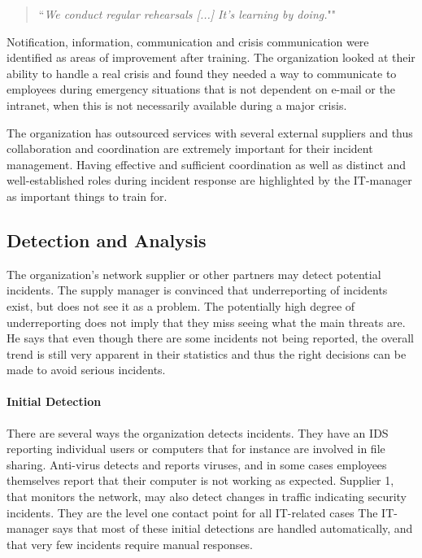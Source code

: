 \begin{quote}
``\textit{We conduct regular rehearsals [...] It's learning by doing.}""
\end{quote}

Notification, information, communication and crisis communication were identified as areas of improvement after training. The organization looked at their ability to handle a real crisis and found they needed a way to communicate to employees during emergency situations that is not dependent on e-mail or the intranet, when this is not necessarily available during a major crisis.

The organization has outsourced services with several external suppliers and thus collaboration and coordination are extremely important for their incident management. Having effective and sufficient coordination as well as distinct and well-established roles during incident response are highlighted by the IT-manager as important things to train for.

\subsection{Detection and Analysis}
The organization's network supplier or other partners may detect potential incidents. The supply manager is convinced that underreporting of incidents exist, but does not see it as a problem. The potentially high degree of underreporting does not imply that they miss seeing what the main threats are. He says that even though there are some incidents not being reported, the overall trend is still very apparent in their statistics and thus the right decisions can be made to avoid serious incidents. 

\paragraph{Initial Detection}
There are several ways the organization detects incidents. They have an \ac{IDS} reporting individual users or computers that for instance are involved in file sharing. Anti-virus detects and reports viruses, and in some cases employees themselves report that their computer is not working as expected. Supplier 1, that monitors the network, may also detect changes in traffic indicating security incidents. They are the level one contact point for all IT-related cases The IT-manager says that most of these initial detections are handled automatically, and that very few incidents require manual responses. 

